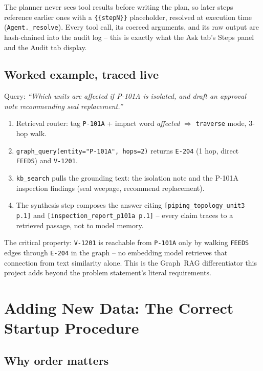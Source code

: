\documentclass[11pt,a4paper]{article}
\newcommand{\code}[1]{\texttt{\small #1}}
\begin{document}
The planner never sees tool results before writing the plan, so later steps
reference earlier ones with a \code{\{\{stepN\}\}} placeholder, resolved at
execution time (\code{Agent.\_resolve}). Every tool call, its coerced
arguments, and its raw output are hash-chained into the audit log --
this is exactly what the Ask tab's Steps panel and the Audit tab display.

\subsection{Worked example, traced live}\label{sec:worked}

Query: \emph{``Which units are affected if P-101A is isolated, and draft an
approval note recommending seal replacement.''}

\begin{enumerate}
  \item Retrieval router: tag \code{P-101A} + impact word \emph{affected}
        $\Rightarrow$ \code{traverse} mode, 3-hop walk.
  \item \code{graph\_query(entity="P-101A", hops=2)} returns
        \code{E-204} (1 hop, direct \code{FEEDS}) and \code{V-1201}.
  \item \code{kb\_search} pulls the grounding text: the isolation note and the
        P-101A inspection findings (seal weepage, recommend replacement).
  \item The synthesis step composes the answer citing
        \code{[piping\_topology\_unit3 p.1]} and \code{[inspection\_report\_p101a p.1]}
        -- every claim traces to a retrieved passage, not to model memory.
\end{enumerate}

The critical property: \code{V-1201} is reachable from \code{P-101A} only by
walking \code{FEEDS} edges through \code{E-204} in the graph -- no embedding
model retrieves that connection from text similarity alone. This is the
Graph~RAG differentiator this project adds beyond the problem statement's
literal requirements.

\section{Adding New Data: The Correct Startup Procedure}\label{sec:reindex}

\subsection{Why order matters}
\end{document}
